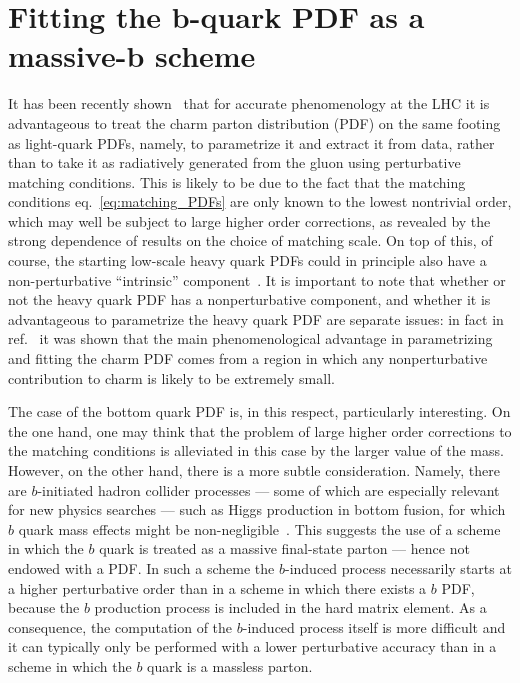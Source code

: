 \chapter{Fitting the b-quark PDF as a massive-b scheme}
\label{ch:bottom}

It has been recently shown~\cite{Ball:2017nwa} that for accurate
phenomenology at the LHC it is advantageous to treat the charm parton
distribution (PDF) on the same footing as light-quark PDFs, namely, to
parametrize it and extract it from data, rather than to take it
as radiatively generated from the gluon using  perturbative matching
conditions. This is likely to be
due to the fact that the matching conditions eq.~\eqref{eq:matching_PDFs} are only known to
the lowest nontrivial order, which may well be subject to large higher
order
corrections, as revealed by the strong dependence of results on the
choice of matching scale. On top of this, of course,
the starting low-scale heavy quark
PDFs could in principle also have a
non-perturbative ``intrinsic''
component~\cite{Brodsky:1980pb,PhysRevD.23.2745}. It is important to note  that
whether or not the heavy quark PDF has a nonperturbative component,
and whether it is advantageous to parametrize the heavy quark PDF are
separate issues: in fact in ref.~\cite{Ball:2017nwa} it was shown that
the main phenomenological
advantage in parametrizing and fitting the charm PDF comes from a region in
which any nonperturbative contribution to charm is likely to be
extremely small. 

The case of the bottom quark PDF is, in this respect, particularly
interesting. On the one hand, one may think that the problem of
large higher order corrections to the matching conditions is alleviated
in this case by the larger value of the mass. However, on the other
hand, there is a more subtle consideration. Namely, there are $b$-initiated
hadron collider processes --- some of which
are especially relevant for new physics searches --- such as Higgs production in
bottom fusion, for which $b$ quark mass effects might be
non-negligible~\cite{Maltoni:2012pa,Lim:2016wjo,Bagnaschi:2018dnh}. This
suggests the use of a scheme in which the $b$ quark is
treated as a 
massive final-state parton --- hence not endowed with a
PDF. In such a scheme
the $b$-induced process necessarily
starts at a higher perturbative order than in  a scheme in which
there exists a $b$ PDF, because the $b$ production process is included in the
hard matrix element. As a consequence, the computation of the
$b$-induced process itself is more difficult and it can typically
only be performed with a lower perturbative accuracy than in a scheme
in which the $b$ quark is a massless parton.

